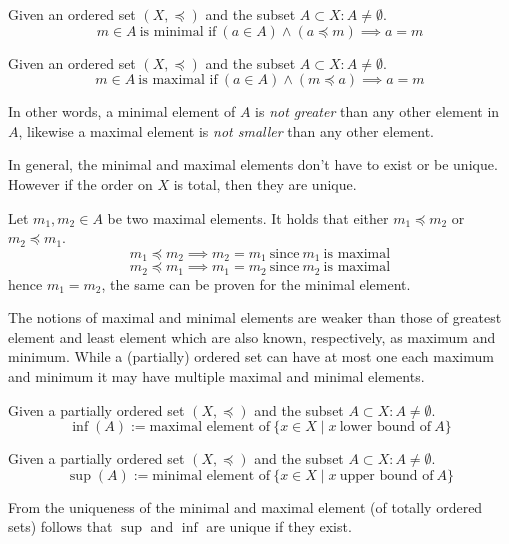 \begin{definition}
   Given an ordered set \((X, \preceq)\) and the subset \(A \subset X: A \neq \emptyset\).
   \[m \in A~\text{is minimal if}~(a \in A) \land (a \preceq m) \implies a = m\]
\end{definition}

\begin{definition}
   Given an ordered set \((X, \preceq)\) and the subset \(A \subset X: A \neq \emptyset\).
   \[m \in A~\text{is maximal if}~(a \in A) \land (m \preceq a) \implies a = m\]
\end{definition}
\begin{remark}
   In other words, a minimal element of \(A\) is \textit{not greater} than any other element in \(A\), likewise a maximal element is \textit{not smaller} than any other element.
\end{remark}
\begin{remark}
   In general, the minimal and maximal elements don't have to exist or be unique.
   However if the order on \(X\) is total, then they are unique.

   Let \(m_1, m_2 \in A\) be two maximal elements.
   It holds that either \(m_1 \preceq m_2\) or \(m_2 \preceq m_1\).
   \[m_1 \preceq m_2 \implies m_2 = m_1~\text{since}~m_1~\text{is maximal}\]
   \[m_2 \preceq m_1 \implies m_1 = m_2~\text{since}~m_2~\text{is maximal}\]
   hence \(m_1 = m_2\), the same can be proven for the minimal element.
\end{remark}
\begin{remark}
   The notions of maximal and minimal elements are weaker than those of greatest element and least element which are also known, respectively, as maximum and minimum.
   While a (partially) ordered set can have at most one each maximum and minimum it may have multiple maximal and minimal elements.
\end{remark}

\begin{definition}[Infimum]
   Given a partially ordered set \((X, \preceq)\) and the subset \(A \subset X: A \neq \emptyset\).
   \[\inf(A) := \text{maximal element of}~\{x \in X \mid x~\text{lower bound of}~A\}\]
\end{definition}

\begin{definition}[Supremum]
   Given a partially ordered set \((X, \preceq)\) and the subset \(A \subset X: A \neq \emptyset\).
   \[\sup(A) := \text{minimal element of}~\{x \in X \mid x~\text{upper bound of}~A\}\]
\end{definition}
\begin{remark}
   From the uniqueness of the minimal and maximal element (of totally ordered sets) follows that \(\sup\) and \(\inf\) are unique if they exist.
\end{remark}


